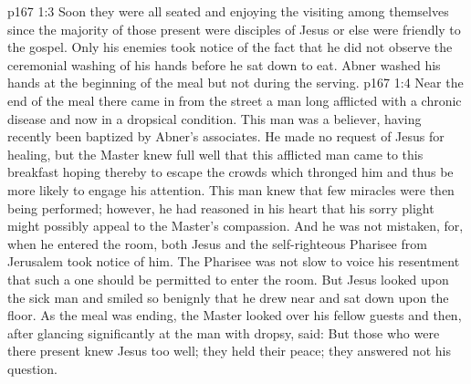 \vs p167 1:3 Soon they were all seated and enjoying the visiting among themselves since the majority of those present were disciples of Jesus or else were friendly to the gospel. Only his enemies took notice of the fact that he did not observe the ceremonial washing of his hands before he sat down to eat. Abner washed his hands at the beginning of the meal but not during the serving.
\vs p167 1:4 Near the end of the meal there came in from the street a man long afflicted with a chronic disease and now in a dropsical condition. This man was a believer, having recently been baptized by Abner’s associates. He made no request of Jesus for healing, but the Master knew full well that this afflicted man came to this breakfast hoping thereby to escape the crowds which thronged him and thus be more likely to engage his attention. This man knew that few miracles were then being performed; however, he had reasoned in his heart that his sorry plight might possibly appeal to the Master’s compassion. And he was not mistaken, for, when he entered the room, both Jesus and the self\hyp{}righteous Pharisee from Jerusalem took notice of him. The Pharisee was not slow to voice his resentment that such a one should be permitted to enter the room. But Jesus looked upon the sick man and smiled so benignly that he drew near and sat down upon the floor. As the meal was ending, the Master looked over his fellow guests and then, after glancing significantly at the man with dropsy, said:  But those who were there present knew Jesus too well; they held their peace; they answered not his question.
